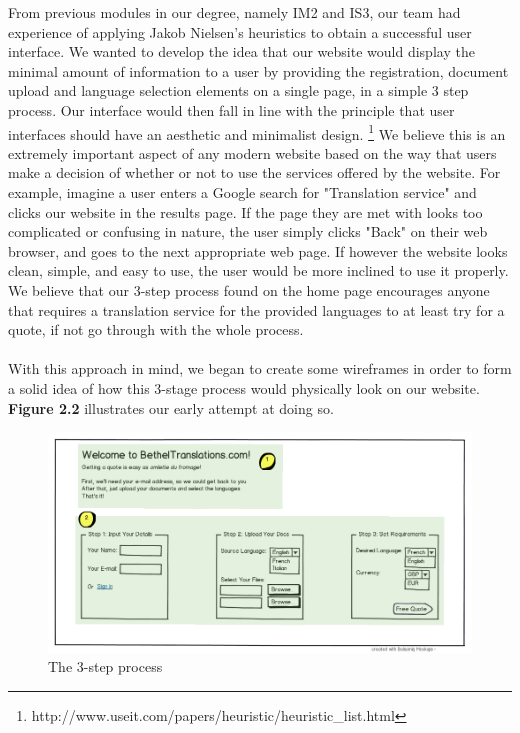 \documentclass{l3proj}
\begin{document}
From previous modules in our degree, namely IM2 and IS3, our team had experience of applying Jakob Nielsen's heuristics to obtain a successful user interface. We wanted to develop the idea that our website would display the minimal amount of information to a user by providing the registration, document upload and language selection elements on a single page, in a simple 3 step process. Our interface would then fall in line with the principle that user interfaces should have an aesthetic and minimalist design. \footnote{http://www.useit.com/papers/heuristic/heuristic\_list.html} We believe this is an extremely important aspect of any modern website based on the way that users make a decision of whether or not to use the services offered by the website. For example, imagine a user enters a Google search for "Translation service" and clicks our website in the results page. If the page they are met with looks too complicated or confusing in nature, the user simply clicks "Back" on their web browser, and goes to the next appropriate web page. If however the website looks clean, simple, and easy to use, the user would be more inclined to use it properly. We believe that our 3-step process found on the home page encourages anyone that requires a translation service for the provided languages to at least try for a quote, if not go through with the whole process.\\
\\
With this approach in mind, we began to create some wireframes in order to form a solid idea of how this 3-stage process would physically look on our website. \textbf{Figure 2.2} illustrates our early attempt at doing so.

\begin{figure}
\begin{center}
\includegraphics[width=\linewidth]{wireframes/bt-3step}
\caption{The 3-step process}
\end{center}
\end{figure}
\end{document}
